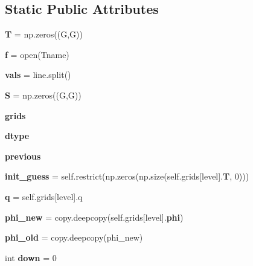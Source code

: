 \subsection*{Static Public Attributes}
\begin{DoxyCompactItemize}
\item 
{\bf T} = np.\+zeros((G,G))
\item 
{\bfseries f} = open(Tname)\label{classmultilevel__solver_1_1_grid_set_a9b73b228e2dc3f229c46af67a8a210dc}

\item 
{\bfseries vals} = line.\+split()\label{classmultilevel__solver_1_1_grid_set_a772b384e433061bfbd1162b28aff7df4}

\item 
{\bfseries S} = np.\+zeros((G,G))\label{classmultilevel__solver_1_1_grid_set_a690ddac10746e324d51532fd07824319}

\item 
{\bfseries grids}\label{classmultilevel__solver_1_1_grid_set_a8a8cdecf798636c0bed2f0ad88f45527}

\item 
{\bfseries dtype}\label{classmultilevel__solver_1_1_grid_set_a1d55c1f48f205b92d1dea1b98b9183ef}

\item 
{\bfseries previous}\label{classmultilevel__solver_1_1_grid_set_ac2d3ae067871ce53d1808883982556e0}

\item 
{\bfseries init\+\_\+guess} = self.\+restrict(np.\+zeros(np.\+size(self.\+grids[level].{\bf T}, 0)))\label{classmultilevel__solver_1_1_grid_set_ae100d604c98077a706e062a9eb862809}

\item 
{\bfseries q} = self.\+grids[level].q\label{classmultilevel__solver_1_1_grid_set_afc3ace0ff6ed59d36d919f415409b0ac}

\item 
{\bfseries phi\+\_\+new} = copy.\+deepcopy(self.\+grids[level].{\bf phi})\label{classmultilevel__solver_1_1_grid_set_a9e069017c1cc277efe37814eef9b6ddf}

\item 
{\bfseries phi\+\_\+old} = copy.\+deepcopy(phi\+\_\+new)\label{classmultilevel__solver_1_1_grid_set_a6f5be1f719a27eecefc53ebd92201bb1}

\item 
int {\bfseries down} = 0\label{classmultilevel__solver_1_1_grid_set_a863767ce4b23e220555f25661f7fc0e0}


\end{DoxyCompactItemize}
